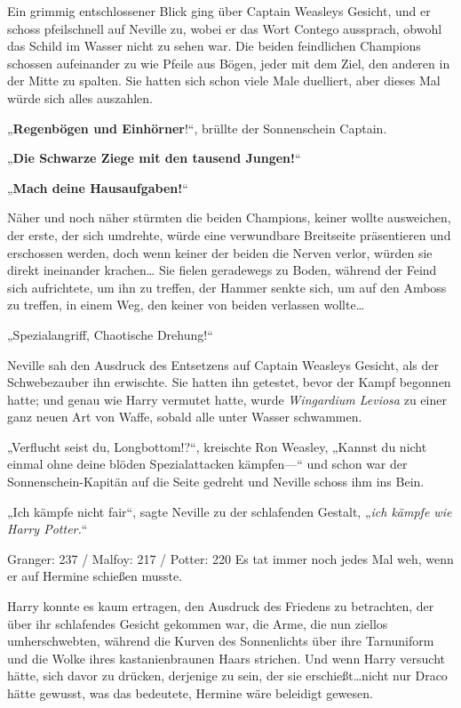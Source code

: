 {Ein grimmig entschlossener Blick ging über Captain Weasleys Gesicht, und er schoss pfeilschnell auf Neville zu, wobei er das Wort Contego aussprach, obwohl das Schild im Wasser nicht zu sehen war. Die beiden feindlichen Champions schossen aufeinander zu wie Pfeile aus Bögen, jeder mit dem Ziel, den anderen in der Mitte zu spalten. Sie hatten sich schon viele Male duelliert, aber dieses Mal würde sich alles auszahlen.

„\textbf{Regenbögen und Einhörner}!“, brüllte der Sonnenschein Captain.

„\textbf{Die Schwarze Ziege mit den tausend Jungen!}“

„\textbf{Mach deine Hausaufgaben!}“

Näher und noch näher stürmten die beiden Champions, keiner wollte ausweichen, der erste, der sich umdrehte, würde eine verwundbare Breitseite präsentieren und erschossen werden, doch wenn keiner der beiden die Nerven verlor, würden sie direkt ineinander krachen… Sie fielen geradewegs zu Boden, während der Feind sich aufrichtete, um ihn zu treffen, der Hammer senkte sich, um auf den Amboss zu treffen, in einem Weg, den keiner von beiden verlassen wollte…

„Spezialangriff, Chaotische Drehung!“

Neville sah den Ausdruck des Entsetzens auf Captain Weasleys Gesicht, als der Schwebezauber ihn erwischte. Sie hatten ihn getestet, bevor der Kampf begonnen hatte; und genau wie Harry vermutet hatte, wurde \emph{Wingardium Leviosa} zu einer ganz neuen Art von Waffe, sobald alle unter Wasser schwammen.

„Verflucht seist du, Longbottom!?“, kreischte Ron Weasley, „Kannst du nicht einmal ohne deine blöden Spezialattacken kämpfen—“ und schon war der Sonnenschein-Kapitän auf die Seite gedreht und Neville schoss ihm ins Bein.

„Ich kämpfe nicht fair“, sagte Neville zu der schlafenden Gestalt, „\emph{ich kämpfe wie Harry Potter.}“

Granger: 237 / Malfoy: 217 / Potter: 220 Es tat immer noch jedes Mal weh, wenn er auf Hermine schießen musste.

Harry konnte es kaum ertragen, den Ausdruck des Friedens zu betrachten, der über ihr schlafendes Gesicht gekommen war, die Arme, die nun ziellos umherschwebten, während die Kurven des Sonnenlichts über ihre Tarnuniform und die Wolke ihres kastanienbraunen Haars strichen. Und wenn Harry versucht hätte, sich davor zu drücken, derjenige zu sein, der sie erschießt…nicht nur Draco hätte gewusst, was das bedeutete, Hermine wäre beleidigt gewesen.

}
